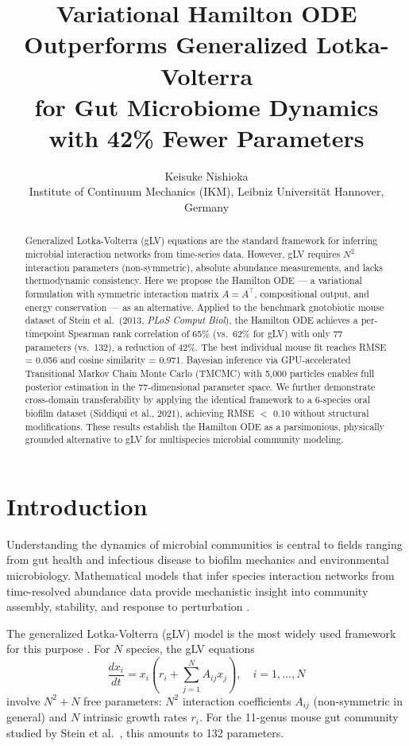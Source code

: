 \documentclass[10pt,a4paper]{article}
\title{Variational Hamilton ODE Outperforms Generalized Lotka-Volterra\\
for Gut Microbiome Dynamics with 42\% Fewer Parameters}
\author{Keisuke Nishioka\\
\small Institute of Continuum Mechanics (IKM), Leibniz Universit\"at Hannover, Germany}
\date{}
\begin{document}
\maketitle

\begin{abstract}
Generalized Lotka-Volterra (gLV) equations are the standard framework for
inferring microbial interaction networks from time-series data. However,
gLV requires $N^2$ interaction parameters (non-symmetric), absolute abundance
measurements, and lacks thermodynamic consistency. Here we propose the
Hamilton ODE --- a variational formulation with symmetric interaction matrix
$A = A^\top$, compositional output, and energy conservation --- as an
alternative. Applied to the benchmark gnotobiotic mouse dataset of Stein
et al.\ (2013, \textit{PLoS Comput Biol}), the Hamilton ODE achieves a
per-timepoint Spearman rank correlation of 65\% (vs.\ 62\% for gLV) with
only 77 parameters (vs.\ 132), a reduction of 42\%. The best individual
mouse fit reaches RMSE = 0.056 and cosine similarity = 0.971. Bayesian
inference via GPU-accelerated Transitional Markov Chain Monte Carlo (TMCMC)
with 5{,}000 particles enables full posterior estimation in the
77-dimensional parameter space. We further demonstrate cross-domain
transferability by applying the identical framework to a 6-species oral
biofilm dataset (Siddiqui et al., 2021), achieving RMSE $<$ 0.10 without
structural modifications. These results establish the Hamilton ODE as a
parsimonious, physically grounded alternative to gLV for multispecies
microbial community modeling.
\end{abstract}

\section{Introduction}

Understanding the dynamics of microbial communities is central to fields
ranging from gut health and infectious disease to biofilm mechanics and
environmental microbiology. Mathematical models that infer species
interaction networks from time-resolved abundance data provide mechanistic
insight into community assembly, stability, and response to perturbation
\cite{stein2013,bucci2016,gerber2014}.

The generalized Lotka-Volterra (gLV) model is the most widely used
framework for this purpose \cite{stein2013,buffie2015,bucci2016}. For
$N$ species, the gLV equations
\begin{equation}
\frac{dx_i}{dt} = x_i \left( r_i + \sum_{j=1}^{N} A_{ij} x_j \right),
\quad i = 1, \ldots, N
\label{eq:glv}
\end{equation}
involve $N^2 + N$ free parameters: $N^2$ interaction coefficients $A_{ij}$
(non-symmetric in general) and $N$ intrinsic growth rates $r_i$.
For the 11-genus mouse gut community studied by Stein et al.\ \cite{stein2013},
this amounts to 132 parameters.
\end{document}
